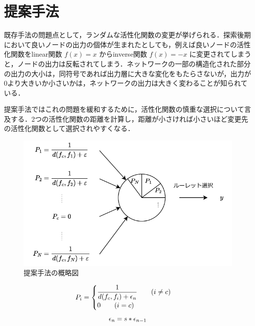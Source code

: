 \section{提案手法}
既存手法の問題点として，ランダムな活性化関数の変更が挙げられる．探索後期において良いノードの出力の個体が生まれたとしても，例えば良いノードの活性化関数をlinear関数 $ f(x) = x $ からinverse関数 $ f(x) = -x $ に変更されてしまうと，ノードの出力は反転されてしまう．ネットワークの一部の構造化された部分の出力の大小は，同符号であれば出力層に大きな変化をもたらさないが，出力が0より大きいか小さいかは，ネットワークの出力は大きく変わることが知られている\cite{WANN}．

提案手法ではこれの問題を緩和するために，活性化関数の慎重な選択について言及する．2つの活性化関数の距離を計算し，距離が小さければ小さいほど変更先の活性化関数として選択されやすくなる．

\begin{figure}[h]
    \begin{center}
        \includegraphics[scale=0.8]{img/exppropose.pdf}
        \caption{提案手法の概略図}
    \end{center}
\end{figure}

\begin{equation}
    P_{i} =  \begin{cases} \dfrac{1}{d(f_{c}, f_{i}) + \epsilon_{n} } \qquad (i \neq c) \\ 0 \qquad (i = c) \end{cases}\\
\end{equation}
\begin{equation}
    \epsilon_{n} = s * \epsilon_{n-1} \\
\end{equation}

